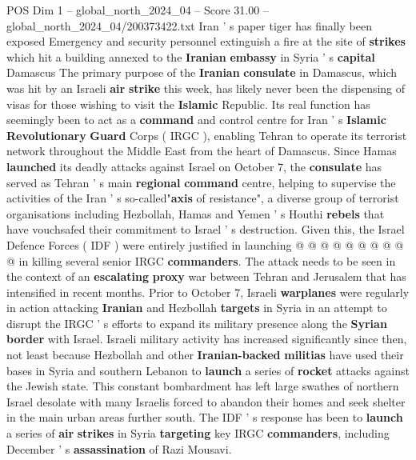 \begin{textsample}{POS Dim 1 – global\_north\_2024\_04 – Score 31.00 – global\_north\_2024\_04/200373422.txt}  \label{ex:f1_pos_152}
Iran ' s paper tiger has finally been exposed Emergency and security personnel extinguish a fire at the site of \textbf{strikes} which hit a building annexed to the \textbf{Iranian} \textbf{embassy} in Syria ' s \textbf{capital} Damascus The primary purpose of the \textbf{Iranian} \textbf{consulate} in Damascus, which was hit by an Israeli \textbf{air} \textbf{strike} this week, has likely never been the dispensing of visas for those wishing to visit the \textbf{Islamic} Republic.
Its real function has seemingly been to act as a \textbf{command} and control centre for Iran ' s \textbf{Islamic} \textbf{Revolutionary} \textbf{Guard} Corps ( IRGC ), enabling Tehran to operate its terrorist network throughout the Middle East from the heart of Damascus.
Since Hamas \textbf{launched} its deadly attacks against Israel on October 7, the \textbf{consulate} has served as Tehran ' s main \textbf{regional} \textbf{command} centre, helping to supervise the activities of the Iran ' s so-called"\textbf{axis} of resistance", a diverse group of terrorist organisations including Hezbollah, Hamas and Yemen ' s Houthi \textbf{rebels} that have vouchsafed their commitment to Israel ' s destruction.
Given this, the Israel Defence Forces ( IDF ) were entirely justified in launching @ @ @ @ @ @ @ @ @ @ in killing several senior IRGC \textbf{commanders}.
The attack needs to be seen in the context of an \textbf{escalating} \textbf{proxy} war between Tehran and Jerusalem that has intensified in recent months.
Prior to October 7, Israeli \textbf{warplanes} were regularly in action attacking \textbf{Iranian} and Hezbollah \textbf{targets} in Syria in an attempt to disrupt the IRGC ' s efforts to expand its military presence along the \textbf{Syrian} \textbf{border} with Israel.
Israeli military activity has increased significantly since then, not least because Hezbollah and other \textbf{Iranian-backed} \textbf{militias} have used their bases in Syria and southern Lebanon to \textbf{launch} a series of \textbf{rocket} attacks against the Jewish state.
This constant bombardment has left large swathes of northern Israel desolate with many Israelis forced to abandon their homes and seek shelter in the main urban areas further south.
The IDF ' s response has been to \textbf{launch} a series of \textbf{air} \textbf{strikes} in Syria \textbf{targeting} key IRGC \textbf{commanders}, including December ' s \textbf{assassination} of Razi Mousavi.

\end{textsample}

